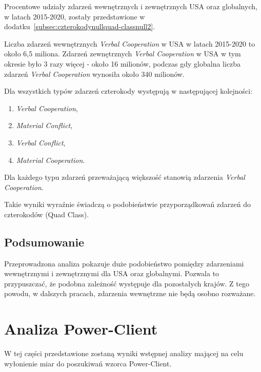 \documentclass[11pt]{report}
\begin{document}
    Procentowe udziały zdarzeń wewnętrznych i zewnętrznych USA oraz globalnych, w latach 2015-2020, zostały przedstawione
    w dodatku~\ref{subsec:czterokodynullquad-classnull2}.

    Liczba zdarzeń wewnętrznych \textit{Verbal Cooperation} w USA w latach 2015-2020 to około 6,5 miliona.
    Zdarzeń zewnętrznych \textit{Verbal Cooperation} w USA w tym okresie było 3 razy więcej - około 16 milionów,
    podczas gdy globalna liczba zdarzeń \textit{Verbal Cooperation} wynosiła około 340 milionów.

    Dla wszystkich typów zdarzeń czterokody występują w następującej kolejności:
    \begin{enumerate}
        \item \textit{Verbal Cooperation},
        \item \textit{Material Conflict},
        \item \textit{Verbal Conflict},
        \item \textit{Material Cooperation}.
    \end{enumerate}
    Dla każdego typu zdarzeń przeważającą większość stanowią zdarzenia \textit{Verbal Cooperation}.

    Takie wyniki wyraźnie świadczą o podobieństwie przyporządkowań zdarzeń do czterokodów (Quad Class).

    \subsection{Podsumowanie}
    Przeprowadzona analiza pokazuje duże podobieństwo pomiędzy zdarzeniami wewnętrznymi i zewnętrznymi dla USA oraz globalnymi.
    Pozwala to przypuszczać, że podobna zależność występuje dla pozostałych krajów.
    Z tego powodu, w dalszych pracach, zdarzenia wewnętrzne nie będą osobno rozważane.


    \section{Analiza Power-Client}\label{sec:analiza-power-client}
    W tej części przedstawione zostaną wyniki wstępnej analizy mającej na celu wyłonienie miar
    do poszukiwań wzorca Power-Client.
\end{document}

